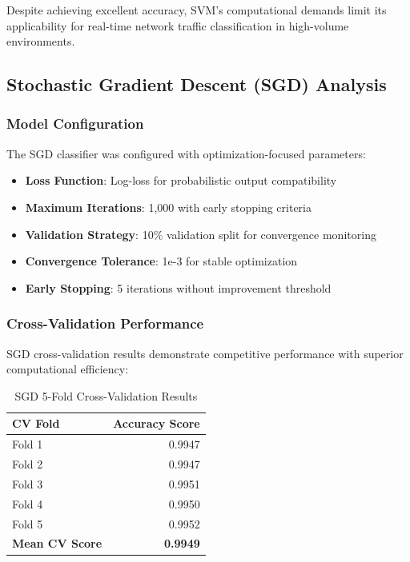 \documentclass[12pt,a4paper]{article}
\begin{document}
Despite achieving excellent accuracy, SVM's computational demands limit its applicability for real-time network traffic classification in high-volume environments.

\subsection{Stochastic Gradient Descent (SGD) Analysis}

\subsubsection{Model Configuration}

The SGD classifier was configured with optimization-focused parameters:

\begin{itemize}
    \item \textbf{Loss Function}: Log-loss for probabilistic output compatibility
    \item \textbf{Maximum Iterations}: 1,000 with early stopping criteria
    \item \textbf{Validation Strategy}: 10\% validation split for convergence monitoring
    \item \textbf{Convergence Tolerance}: 1e-3 for stable optimization
    \item \textbf{Early Stopping}: 5 iterations without improvement threshold
\end{itemize}

\subsubsection{Cross-Validation Performance}

SGD cross-validation results demonstrate competitive performance with superior computational efficiency:

\begin{table}[H]
\centering
\begin{tabular}{@{}lr@{}}
\toprule
\textbf{CV Fold} & \textbf{Accuracy Score} \\
\midrule
Fold 1 & 0.9947 \\
Fold 2 & 0.9947 \\
Fold 3 & 0.9951 \\
Fold 4 & 0.9950 \\
Fold 5 & 0.9952 \\
\midrule
\textbf{Mean CV Score} & \textbf{0.9949} \\
\bottomrule
\end{tabular}
\caption{SGD 5-Fold Cross-Validation Results}
\end{table}
\end{document}
